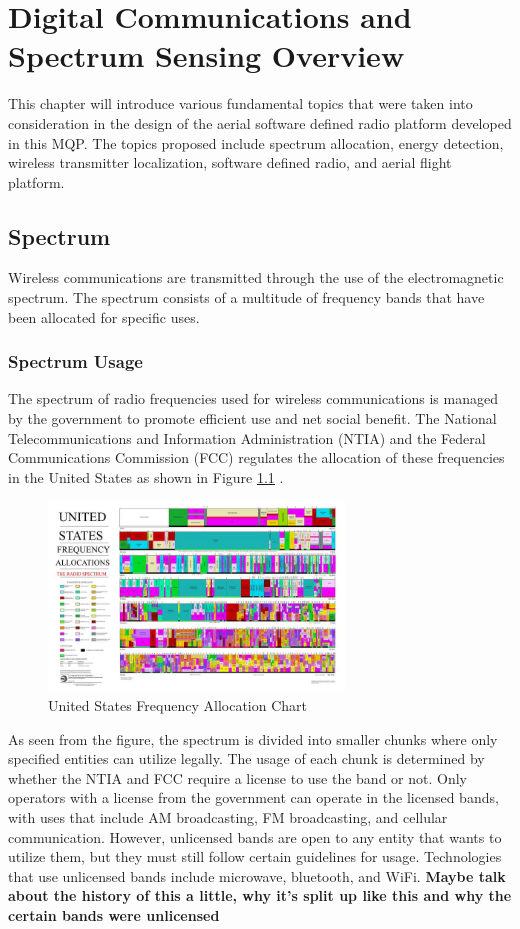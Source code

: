 \chapter{Digital Communications and Spectrum Sensing Overview}
This chapter will introduce various fundamental topics that were taken into consideration in the design of the aerial software defined radio platform developed in this MQP. The topics proposed include spectrum allocation, energy detection, wireless transmitter localization, software defined radio, and aerial flight platform.

\section{Spectrum}
Wireless communications are transmitted through the use of the electromagnetic spectrum. The spectrum consists of a multitude of frequency bands that have been allocated for specific uses.

\subsection{Spectrum Usage}
The spectrum of radio frequencies used for wireless communications is managed by the government to promote efficient use and net social benefit. The National Telecommunications and Information Administration (NTIA) and the Federal Communications Commission (FCC) regulates the allocation of these frequencies in the United States as shown in Figure \ref{fig:freq_chart} \cite{FCC_Info}. 
\begin{figure}[ht]
\centering
\includegraphics[width=0.70\textwidth]{img/the_radio_spectrum.jpg}
\caption{United States Frequency Allocation Chart \cite{FCC_Info}}
\label{fig:freq_chart}
\end{figure}
As seen from the figure, the spectrum is divided into smaller chunks where only specified entities can utilize legally. The usage of each chunk is determined by whether the NTIA and FCC require a license to use the band or not. Only operators with a license from the government can operate in the licensed bands, with uses that include AM broadcasting, FM broadcasting, and cellular communication. However, unlicensed bands are open to any entity that wants to utilize them, but they must still follow certain guidelines for usage. Technologies that use unlicensed bands include microwave, bluetooth, and WiFi. \textbf{Maybe talk about the history of this a little, why it's split up like this and why the certain bands were unlicensed}

